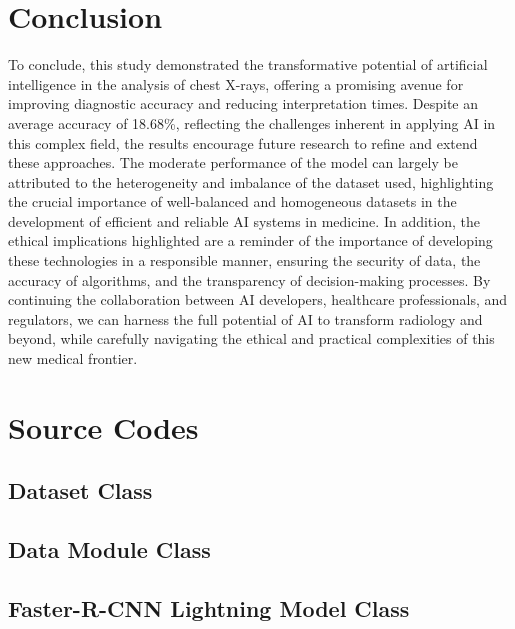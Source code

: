 \documentclass[12pt,oneside]{book} %
\begin{document}
\chapter{Conclusion}

To conclude, this study demonstrated the transformative potential of artificial
intelligence in the analysis of chest X-rays, offering a promising avenue for
improving diagnostic accuracy and reducing interpretation times. Despite an
average accuracy of 18.68\%, reflecting the challenges inherent in applying AI
in this complex field, the results encourage future research to refine and
extend these approaches. The moderate performance of the model can largely be
attributed to the heterogeneity and imbalance of the dataset used, highlighting
the crucial importance of well-balanced and homogeneous datasets in the
development of efficient and reliable AI systems in medicine. In addition, the
ethical implications highlighted are a reminder of the importance of developing
these technologies in a responsible manner, ensuring the security of data, the
accuracy of algorithms, and the transparency of decision-making processes. By
continuing the collaboration between AI developers, healthcare professionals,
and regulators, we can harness the full potential of AI to transform radiology
and beyond, while carefully navigating the ethical and practical complexities
of this new medical frontier.




\appendix
\chapter{Source Codes}
\begin{subappendices}
    \section{Dataset Class}\label{appendix:ChestXrayDataset}
    

    \newpage
    \section{Data Module Class}\label{appendix:ChestXrayDataModule}
    

    \newpage
    \section{Faster-R-CNN Lightning Model Class}\label{appendix:ChestXrayLightningModel}
    
\end{subappendices}

\end{document}
